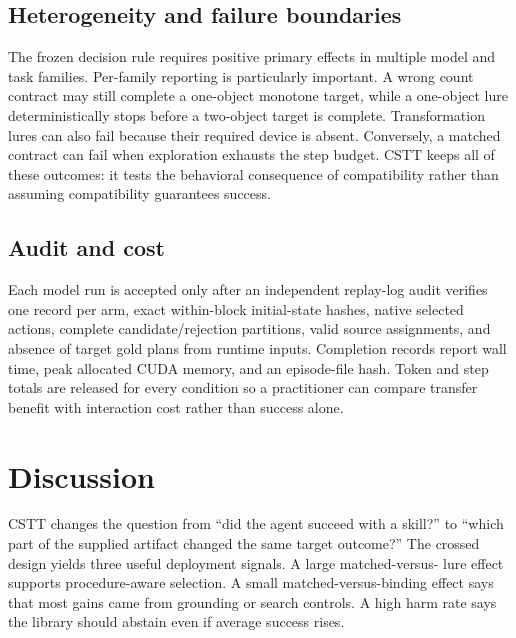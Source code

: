 \documentclass[10pt]{article}
\begin{document}
\subsection{Heterogeneity and failure boundaries}

The frozen decision rule requires positive primary effects in multiple model
and task families. Per-family reporting is particularly important. A wrong
count contract may still complete a one-object monotone target, while a
one-object lure deterministically stops before a two-object target is complete.
Transformation lures can also fail because their required device is absent.
Conversely, a matched contract can fail when exploration exhausts the step
budget. CSTT keeps all of these outcomes: it tests the behavioral consequence
of compatibility rather than assuming compatibility guarantees success.

\subsection{Audit and cost}
Each model run is accepted only after an independent replay-log audit verifies
one record per arm, exact within-block initial-state hashes, native selected
actions, complete candidate/rejection partitions, valid source assignments, and
absence of target gold plans from runtime inputs. Completion records report
wall time, peak allocated CUDA memory, and an episode-file hash. Token and step
totals are released for every condition so a practitioner can compare transfer
benefit with interaction cost rather than success alone.

\section{Discussion}
CSTT changes the question from ``did the agent succeed with a skill?'' to
``which part of the supplied artifact changed the same target outcome?'' The
crossed design yields three useful deployment signals. A large matched-versus-
lure effect supports procedure-aware selection. A small matched-versus-binding
effect says that most gains came from grounding or search controls. A high harm
rate says the library should abstain even if average success rises.
\end{document}
